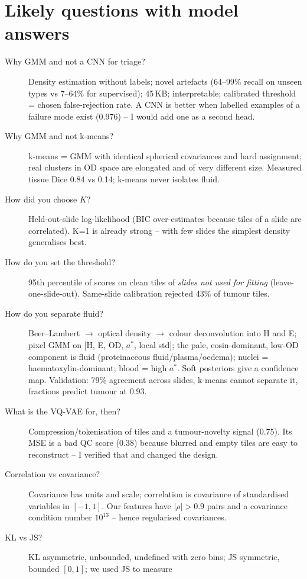 \section{Likely questions with model answers}
\begin{description}
\item[Why GMM and not a CNN for triage?] Density estimation without labels; novel artefacts (64--99\% recall on unseen types
vs 7--64\% for supervised); 45\,KB; interpretable; calibrated threshold = chosen false-rejection rate. A CNN is better
when labelled examples of a failure mode exist (0.976) -- I would add one as a second head.
\item[Why GMM and not k-means?] k-means = GMM with identical spherical covariances and hard assignment; real clusters
in OD space are elongated and of very different size. Measured tissue Dice 0.84 vs 0.14; k-means never isolates fluid.
\item[How did you choose $K$?] Held-out-slide log-likelihood (BIC over-estimates because tiles of a slide are correlated).
K=1 is already strong -- with few slides the simplest density generalises best.
\item[How do you set the threshold?] 95th percentile of scores on clean tiles of \emph{slides not used for fitting}
(leave-one-slide-out). Same-slide calibration rejected 43\% of tumour tiles.
\item[How do you separate fluid?] Beer--Lambert $\to$ optical density $\to$ colour deconvolution into H and E; pixel GMM on
[H, E, OD, $a^*$, local std]; the pale, eosin-dominant, low-OD component is fluid (proteinaceous fluid/plasma/oedema);
nuclei = haematoxylin-dominant; blood = high $a^*$. Soft posteriors give a confidence map. Validation: 79\% agreement across
slides, k-means cannot separate it, fractions predict tumour at 0.93.
\item[What is the VQ-VAE for, then?] Compression/tokenisation of tiles and a tumour-novelty signal (0.75). Its MSE is a bad QC
score (0.38) because blurred and empty tiles are easy to reconstruct -- I verified that and changed the design.
\item[Correlation vs covariance?] Covariance has units and scale; correlation is covariance of standardised variables in
$[-1,1]$. Our features have $|\rho|>0.9$ pairs and a covariance condition number $10^{13}$ -- hence regularised covariances.
\item[KL vs JS?] KL asymmetric, unbounded, undefined with zero bins; JS symmetric, bounded $[0,1]$; we used JS to measure

\end{description}
